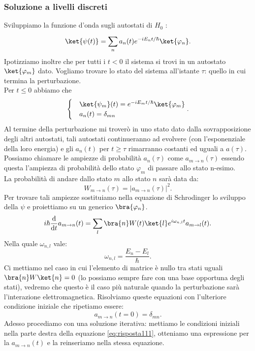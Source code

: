 \subsubsection{Soluzione a livelli discreti}%
Sviluppiamo la funzione d'onda sugli autostati di $H_0$ :
\[
    \ket{\psi(t)}=\sum_{n}^{} a_n(t) e^{-i E_n t /\hbar }\ket{\varphi_n}
.\] 
Ipotizziamo inoltre che per tutti i $t<0$ il sistema si trovi in un autostato $\ket{\varphi_m}$ dato. Vogliamo trovare lo stato del sistema all'istante $ \tau$: quello in cui termina la perturbazione.\\
Per $t\le 0$ abbiamo che 
\[\begin{aligned}
    \begin{cases}
    &\ket{\psi_m}(t) = e^{-iE_m t /\hbar } \ket{\varphi_m}\\
    &a_n(t) = \delta_{mn}
    \end{cases}
.\end{aligned}\]
Al termine della perturbazione mi troverò in uno stato dato dalla sovrapposizione degli altri autostati, tali autostati continueranno ad evolvere (con l'esponenziale della loro energia) e gli $a_n(t)$ per $t\ge \tau$ rimarranno costanti ed uguali a $a(\tau)$.\\
Possiamo chiamare le ampiezze di probabilità $a_n(\tau)$ come $a_{m\to n}(\tau) $ essendo questa l'ampiezza di probabilità dello stato $\varphi_m$ di passare allo stato n-esimo.\\
La probabilità di andare dallo stato $m$ allo stato $n$ sarà data da:
\[
    W_{m\to n}(\tau)=\left|a_{m\to n}(\tau) \right|^2
.\] 
Per trovare tali ampiezze sostituiamo nella equazione di Schrodinger lo sviluppo della $\psi$ e proiettiamo su un generico $\bra{\varphi_n}$.\\
\[
    i\hbar \frac{\text{d} }{\text{d} t} a_{m\to n}(t) 
    = \sum_{l}^{} \bra{n}W(t)\ket{l}e^{i\omega_{n,l} t}a_{m\to l}(t) \label{eq:risposta111}
.\] 
Nella quale $\omega_{n,l}$  vale:
\[
\omega_{n,l}=\frac{E_n-E_l}{\hbar }
.\] 
Ci mettiamo nel caso in cui l'elemento di matrice è nullo tra stati uguali $\bra{n}W\ket{n} = 0$ (lo possiamo sempre fare con una base opportuna degli stati), vedremo che questo è il caso più naturale quando la perturbazione sarà l'interazione elettromagnetica.
Risolviamo queste equazioni con l'ulteriore condizione iniziale che ripetiamo essere:
\[
    a_{m\to n}(t=0) = \delta_{mn}
.\] 
Adesso procediamo con una soluzione iterativa: mettiamo le condizioni iniziali nella parte destra della equazione \ref{eq:risposta111}, otteniamo una espressione per la $a_{m\to n}(t) $ e la reinseriamo nella stessa equazione. \\
